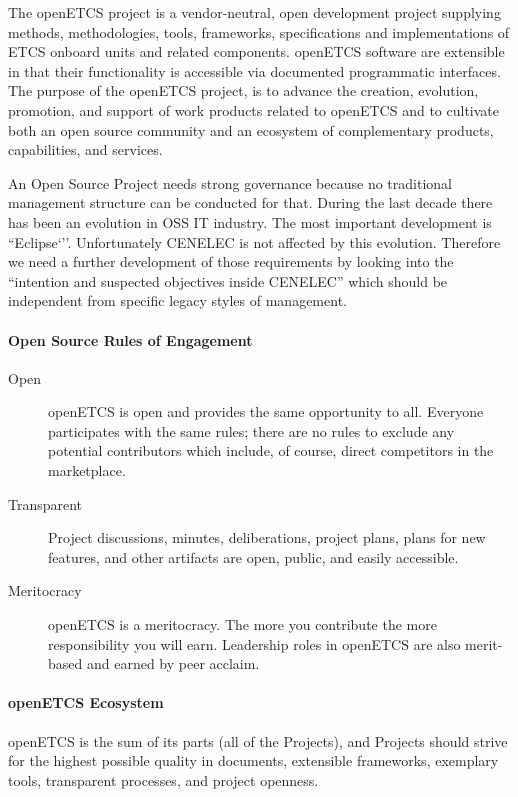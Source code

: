 \documentclass{template/openetcs_article}
\begin{document}
The openETCS project is a vendor-neutral, open development project supplying methods, methodologies, tools, frameworks, specifications and implementations of ETCS onboard units and related components. openETCS software are extensible in that their functionality is accessible via documented programmatic interfaces. The purpose of the openETCS project, is to advance the creation, evolution, promotion, and support of work products related to openETCS and to cultivate both an open source community and an ecosystem of complementary products, capabilities, and services. 

An Open Source Project needs strong governance because no traditional management structure can be conducted for that. During the last decade there has been an evolution in OSS IT industry. The most important development is ``Eclipse`''. Unfortunately CENELEC is not affected by this evolution. Therefore we need a further development of those requirements by looking into the ``intention and suspected objectives inside CENELEC'' which should be independent from specific legacy styles of management.


\paragraph{Open Source Rules of Engagement}
\begin{description}
\item[Open]openETCS is open and provides the same opportunity to all. Everyone participates with the same rules; there are no rules to exclude any potential contributors which include, of course, direct competitors in the marketplace.

\item[Transparent]Project discussions, minutes, deliberations, project plans, plans for new features, and other artifacts are open, public, and easily accessible.

\item[Meritocracy]openETCS is a meritocracy. The more you contribute the more responsibility you will earn. Leadership roles in openETCS are also merit-based and earned by peer acclaim.
\end{description}

\paragraph{openETCS Ecosystem}
openETCS is the sum of its parts (all of the Projects), and Projects should strive for the highest possible quality in documents, extensible frameworks, exemplary tools, transparent processes, and project openness.
\end{document}
